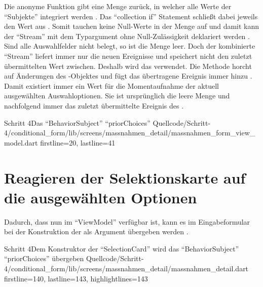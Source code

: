 Die anonyme Funktion gibt eine Menge zurück,
in welcher alle Werte der \enquote{Subjekte} integriert werden .
Das \enquote{collection if} Statement schließt dabei jeweils den Wert  aus .
Somit tauchen keine Null-Werte in der Menge auf und damit kann der \enquote{Stream} mit dem Typargument  ohne Null-Zulässigkeit deklariert werden .
Sind alle Auswahlfelder nicht belegt,
so ist die Menge leer.
Doch der kombinierte \enquote{Stream}  liefert immer nur die neuen Ereignisse und speichert nicht den zuletzt übermittelten Wert zwischen.
Deshalb wird das   verwendet.
Die Methode  horcht auf Änderungen des -Objektes und fügt das übertragene Ereignis immer  hinzu . 
Damit existiert immer ein Wert für die Momentaufnahme der aktuell ausgewählten Auswahloptionen.
Sie ist ursprünglich die leere Menge \IC{{}} und nachfolgend immer das zuletzt übermittelte Ereignis des .

\begin{alexlisting}{Schritt 4}{Das \enquote{BehaviorSubject} \enquote{priorChoices}}
  {Quellcode/Schritt-4/conditional_form/lib/screens/massnahmen_detail/massnahmen_form_view_model.dart}
  {firstline=20, lastline=41}
  \label{lst:Schritt4priorChoices}
\end{alexlisting}

\clearpage
\section{Reagieren der Selektionskarte auf die ausgewählten Optionen}

Dadurch,
dass  nun im \enquote{ViewModel} verfügbar ist,
kann es im Eingabeformular bei der Konstruktion der  als Argument übergeben werden .

\begin{alexlisting}{Schritt 4}{Dem Konstruktor der \enquote{SelectionCard} wird das \enquote{BehaviorSubject} \enquote{priorChoices} übergeben}
  {Quellcode/Schritt-4/conditional_form/lib/screens/massnahmen_detail/massnahmen_detail.dart}
  {firstline=140, lastline=143, highlightlines={143}}
  \label{lst:Schritt4builderSelectionCard}
\end{alexlisting}

